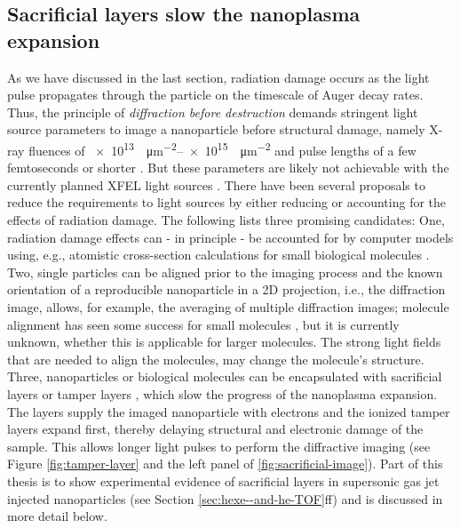 \subsection{Sacrificial layers slow the nanoplasma expansion}\label{sec:tampered-layers}
%
%
%
As we have discussed in the last section, radiation damage occurs as the light pulse propagates through the particle on the timescale of Auger decay rates. Thus, the principle of \textit{diffraction before destruction} \citep{Neutze-2000-Nature} demands stringent light source parameters to image a nanoparticle before structural damage, namely X-ray fluences of \SIrange{e13}{e15}{\photons\per\square\micro\meter} and pulse lengths of a few femtoseconds or shorter \citep{Hau-Riege-2005-PRE}. But these parameters are likely not achievable with the currently planned XFEL light sources \cite{Huldt-2003-JSB}. There have been several proposals to reduce the requirements to light sources \citep{Aquila-2015-StrucDyn} by either reducing or accounting for the effects of radiation damage. The following lists three promising candidates: One, radiation damage effects can - in principle - be accounted for by computer models using, e.g., atomistic cross-section calculations for small biological molecules \cite{Ho-2016-PRA,Quiney-2010-NatPhys}. Two, single particles can be aligned prior to the imaging process \citep{Hau-Riege-2005-PRE} and the known orientation of a reproducible nanoparticle in a 2D projection, i.e., the diffraction image, allows, for example, the averaging of multiple diffraction images; molecule alignment has seen some success for small molecules \citep{Kupper-2014-PRL}, but it is currently unknown, whether this is applicable for larger molecules. The strong light fields that are needed to align the molecules, may change the molecule's structure. Three, nanoparticles or biological molecules can be encapsulated with sacrificial layers or tamper layers \citep{Hau-Riege-2007-PRL}, which slow the progress of the nanoplasma expansion. The layers supply the imaged nanoparticle with electrons and the ionized tamper layers expand first, thereby delaying structural and electronic damage of the sample. This allows longer light pulses to perform the diffractive imaging (see Figure \ref{fig:tamper-layer} and the left panel of \ref{fig:sacrificial-image}). Part of this thesis is to show experimental evidence of sacrificial layers in supersonic gas jet injected nanoparticles (see Section \ref{sec:hexe--and-he-TOF}ff) and is discussed in more detail below.\\[1\baselineskip]

